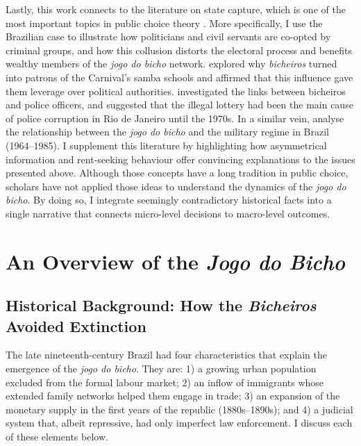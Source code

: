 \documentclass[a4paper,12pt]{article}
\begin{document}
Lastly, this work connects to the literature on state capture, which is one of the most important topics in public choice theory \citep{rose1978corruption,shleifer2002grabbing,tollison1982rent}. More specifically, I use the Brazilian case to illustrate how politicians and civil servants are co-opted by criminal groups, and how this collusion distorts the electoral process and benefits wealthy members of the \textit{jogo do bicho} network. \citet{queiroz1992carnaval} explored why \textit{bicheiros} turned into patrons of the Carnival's samba schools and affirmed that this influence gave them leverage over political authorities. \citet{misse2007illegal} investigated the links between bicheiros and police officers, and suggested that the illegal lottery had been the main cause of police corruption in Rio de Janeiro until the 1970s. In a similar vein, \citet{jupiara2015poroes} analyse the relationship between the \textit{jogo do bicho} and the military regime in Brazil (1964--1985). I supplement this literature by highlighting how asymmetrical information and rent-seeking behaviour offer convincing explanations to the issues presented above. Although those concepts have a long tradition in public choice, scholars have not applied those ideas to understand the dynamics of the \textit{jogo do bicho}. By doing so, I integrate seemingly contradictory historical facts into a single narrative that connects micro-level decisions to macro-level outcomes. 

\section{An Overview of the \textit{Jogo do Bicho}}%
\label{sec:overview}

\subsection{Historical Background: How the \textit{Bicheiros} Avoided Extinction}%
\label{sub:historical_background}

The late nineteenth-century Brazil had four characteristics that explain the emergence of the \textit{jogo do bicho}. They are: 1) a growing urban population excluded from the formal labour market; 2) an inflow of immigrants whose extended family networks helped them engage in trade; 3) an expansion of the monetary supply in the first years of the republic (1880s--1890s); and 4) a judicial system that, albeit repressive, had only imperfect law enforcement. I discuss each of these elements below.
\end{document}
